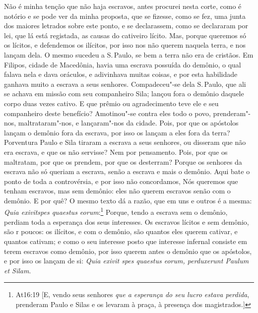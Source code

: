 Não é minha tenção que não haja escravos, antes procurei nesta corte,
como é notório e se pode ver da minha proposta, que se fizesse, como se
fez, uma junta dos maiores letrados sobre este ponto, e se declarassem,
como se declararam por lei, que lá está
registada, as causas do cativeiro lícito. Mas, porque queremos só os
lícitos, e defendemos os ilícitos, por isso nos não querem naquela
terra, e nos lançam dela. O mesmo sucedeu a S.\,Paulo, se bem a terra não
era de cristãos. Em Filipos, cidade de Macedônia, havia uma escrava
possuída do demônio, o qual falava nela e dava oráculos, e adivinhava
muitas coisas, e por esta habilidade ganhava muito a escrava a seus
senhores. Compadeceu"-se dela S.\,Paulo, que ali se achava em missão com
seu companheiro Sila; lançou fora o demônio daquele corpo duas vezes
cativo. E que prêmio ou agradecimento teve ele e seu companheiro deste
benefício? Amotinou"-se contra eles todo o povo, prenderam"-nos,
maltrataram"-nos, e lançaram"-nos da cidade. Pois, por que os apóstolos
lançam o demônio fora da escrava, por isso os lançam a eles fora da
terra? Porventura Paulo e Sila tiraram a escrava a seus senhores, ou
disseram que não era escrava, e que os não servisse? Nem por pensamento.
Pois, por que os maltratam, por que os prendem, por que os desterram?
Porque os senhores da escrava não só queriam a escrava, senão a escrava
e mais o demônio. Aqui bate o ponto de toda a controvérsia, e por isso
não concordamos, Nós queremos que tenham escravos, mas sem demônio: eles
não querem escravos senão com o demônio. E por quê? O mesmo texto dá a
razão, que em uns e outros é a mesma: \emph{Quia exivitspes quaestus
eorum}:\footnote{At16:19 [E, vendo seus senhores \emph{que a esperança do seu lucro estava perdida}, prenderam Paulo e Silas e os levaram à praça, à presença dos magistrados.]} Porque, tendo a escrava sem o demônio, perdiam toda
a esperança dos seus interesses. Os escravos lícitos e sem demônio, são
r poucos: os ilícitos, e com o demônio, são quantos eles querem cativar,
e quantos cativam; e como o seu interesse posto que interesse infernal
consiste em terem escravos como demônio, por isso querem antes o demônio
que os apóstolos, e por isso os lançam de si: \emph{Quia exivit spes
quaestus eorum, perduxerunt Paulum et Silam}.

